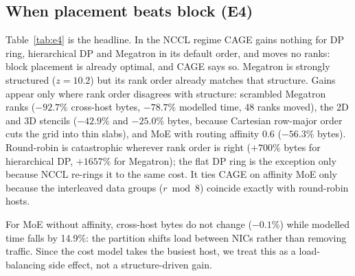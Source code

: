 \documentclass[conference]{IEEEtran}
\begin{document}
\subsection{When placement beats block (E4)}\label{sec:e4}
Table~\ref{tab:e4} is the headline. In the NCCL regime CAGE gains nothing for DP ring, hierarchical
DP and Megatron in its default order, and moves no ranks: block placement is already optimal, and
CAGE says so. Megatron is strongly structured ($z=10.2$) but its rank order already matches that
structure. Gains appear only where rank order disagrees with structure: scrambled Megatron ranks
($-92.7\%$ cross-host bytes, $-78.7\%$ modelled time, 48 ranks moved), the 2D and 3D stencils
($-42.9\%$ and $-25.0\%$ bytes, because Cartesian row-major order cuts the grid into thin slabs), and
MoE with routing affinity 0.6 ($-56.3\%$ bytes). Round-robin is catastrophic wherever rank order is
right ($+700\%$ bytes for hierarchical DP, $+1657\%$ for Megatron); the flat DP ring is the
exception only because NCCL re-rings it to the same cost. It ties CAGE on affinity MoE
only because the interleaved data groups ($r \bmod 8$) coincide exactly with round-robin hosts.

For MoE without affinity, cross-host bytes do not change ($-0.1\%$) while modelled time falls by
14.9\%: the partition shifts load between NICs rather than removing traffic. Since the cost model
takes the busiest host, we treat this as a load-balancing side effect, not a structure-driven gain.
\end{document}
